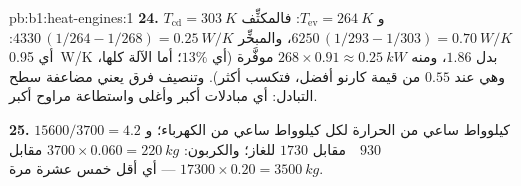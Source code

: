 \begin{solution}{pb:b1:heat-engines:1}
\textbf{24.} $T_{\mathrm{cd}} = \qty{303}{K}$ و $T_{\mathrm{ev}} = \qty{264}{K}$:
فالمكثِّف $6250\,(1/293 - 1/303) = \qty{0.70}{W/K}$، والمبخِّر
$4330\,(1/264 - 1/268) = \qty{0.25}{W/K}$: أي \qty{0.95}{W/K} بدل
$1.86$، ومنه $268 \times 0.91 \approx \qty{0.25}{kW}$ موفَّرة (أي $13\%$؛ أما
الآلة كلها، وهي عند $0.55$ من قيمة كارنو أفضل، فتكسب
أكثر). وتنصيف فرق يعني مضاعفة سطح التبادل: أي مبادلات أكبر
وأغلى واستطاعة مراوح أكبر.

\textbf{25.} $15600/3700 = 4.2$ كيلوواط ساعي من الحرارة لكل كيلوواط ساعي
من الكهرباء؛ و $930$~\texteuro\ مقابل $1730$ للغاز؛ والكربون: $3700
\times 0.060 = \qty{220}{kg}$ مقابل $17300 \times 0.20 = \qty{3500}{kg}$ ---
أي أقل خمس عشرة مرة.
\end{solution}
